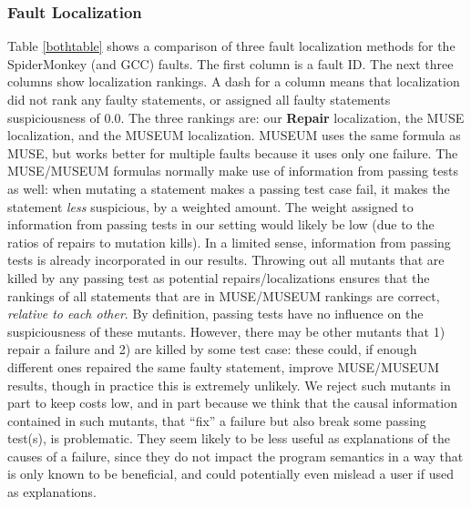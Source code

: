 \subsubsection{Fault Localization}

Table \ref{bothtable} shows a comparison of three fault localization methods for the SpiderMonkey (and GCC) faults.  The first column is a fault ID. The next three columns show localization rankings.  A dash for a column means that localization did not rank any faulty statements, or assigned all faulty statements suspiciousness of 0.0.  The three rankings are: our {\bf Repair} localization, the MUSE \cite{MUSE} localization, and the MUSEUM \cite{multilingual} localization.  MUSEUM uses the same formula as MUSE, but works better for multiple faults because it uses only one failure.  The MUSE/MUSEUM formulas normally make use of information from passing tests as well: when mutating a statement makes a passing test case fail, it makes the statement \emph{less} suspicious, by a weighted amount. The weight assigned to information from passing tests in our setting would likely be low (due to the ratios of repairs to mutation kills).  In a limited sense, information from passing tests is already incorporated in our results.  Throwing out all mutants that are killed by any passing test as potential repairs/localizations ensures that the rankings of all statements that are in MUSE/MUSEUM rankings are correct, \emph{relative to each other}.  By definition, passing tests have no influence on the suspiciousness of these mutants.  However, there may be other mutants that 1) repair a failure and 2) are killed by some test case: these could, if enough different ones repaired the same faulty statement, improve MUSE/MUSEUM results, though in practice this is extremely unlikely.  We reject such mutants in part to keep costs low, and in part because we think that the causal information contained in such mutants, that ``fix'' a failure but also break some passing test(s), is problematic.  They seem likely to be less useful as explanations of the causes of a failure, since they do not impact the program semantics in a way that is only known to be beneficial, and could potentially even mislead a user if used as explanations.


